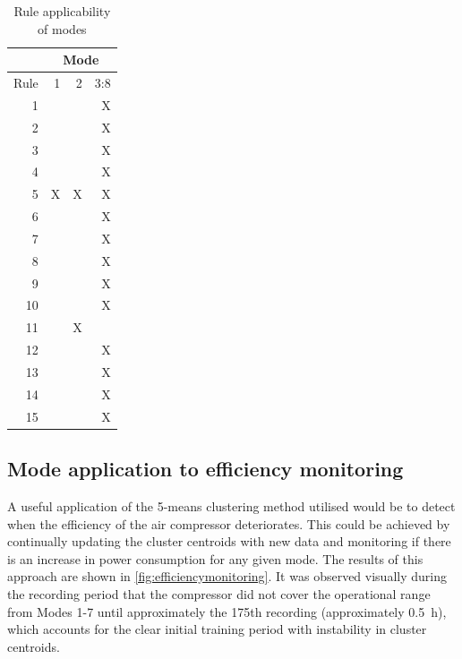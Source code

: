 \begin{table}[htbp]
  \centering
  \caption{Rule applicability of modes}
    \begin{tabular}{r|rrr}
    \toprule
          & \multicolumn{3}{c}{Mode} \\
    \midrule
     Rule & 1     & 2     & 3:8 \\
     \midrule
    1     &       &       & X \\
    2     &       &       & X \\
    3     &       &       & X \\
    4     &       &       & X \\
    5     & X     & X     & X \\
    6     &       &       & X \\
    7     &       &       & X \\
    8     &       &       & X \\
    9     &       &       & X \\
    10    &       &       & X \\
    11    &       & X     &  \\
    12    &       &       & X \\
    13    &       &       & X \\
    14    &       &       & X \\
    15    &       &       & X \\
    \bottomrule
    \end{tabular}%
  \label{tab:modeapplication}%
\end{table}%


\subsection{Mode application to efficiency monitoring}
\label{subsec:modeefficiency}
A useful application of the 5-means clustering method utilised would be to detect when the efficiency of the air compressor deteriorates. This could be achieved by continually updating the cluster centroids with new data and monitoring if there is an increase in power consumption for any given mode. The results of this approach are shown in \autoref{fig:efficiencymonitoring}. It was observed visually during the recording period that the compressor did not cover the operational range from Modes 1-7  until approximately the 175th recording (approximately \SI{0.5}{\hour}), which accounts for the clear initial training period with instability in cluster centroids. 

